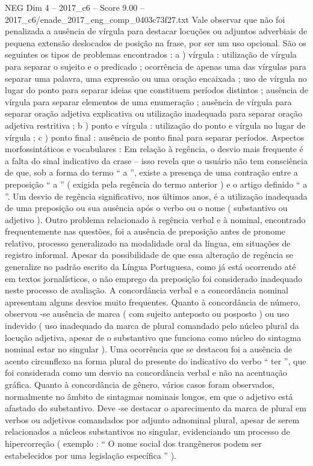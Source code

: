 \begin{textsample}{NEG Dim 4 – 2017\_c6 – Score 9.00 – 2017\_c6/enade\_2017\_eng\_comp\_0403c73f27.txt}
Vale observar que não foi penalizada a ausência de vírgula para destacar locuções ou adjuntos adverbiais de pequena extensão deslocados de posição na frase, por ser um uso opcional.
São os seguintes os tipos de problemas encontrados : a ) vírgula : utilização de vírgula para separar o sujeito e o predicado ; ocorrência de apenas uma das vírgulas para separar uma palavra, uma expressão ou uma oração encaixada ; uso de vírgula no lugar do ponto para separar ideias que constituem períodos distintos ; ausência de vírgula para separar elementos de uma enumeração ; ausência de vírgula para separar oração adjetiva explicativa ou utilização inadequada para separar oração adjetiva restritiva ; b ) ponto e vírgula : utilização do ponto e vírgula no lugar de vírgula ; c ) ponto final : ausência de ponto final para separar períodos.
Aspectos morfossintáticos e vocabulares : Em relação à regência, o desvio mais frequente é a falta do sinal indicativo da crase – isso revela que o usuário não tem consciência de que, sob a forma do termo “ a ”, existe a presença de uma contração entre a preposição “ a ” ( exigida pela regência do termo anterior ) e o artigo definido “ a ”.
Um desvio de regência significativo, nos últimos anos, é a utilização inadequada de uma preposição ou sua ausência após o verbo ou o nome ( substantivo ou adjetivo ).
Outro problema relacionado à regência verbal e à nominal, encontrado frequentemente nas questões, foi a ausência de preposição antes de pronome relativo, processo generalizado na modalidade oral da língua, em situações de registro informal.
Apesar da possibilidade de que essa alteração de regência se generalize no padrão escrito da Língua Portuguesa, como já está ocorrendo até em textos jornalísticos, o não emprego da preposição foi considerado inadequado neste processo de avaliação.
A concordância verbal e a concordância nominal apresentam alguns desvios muito frequentes.
Quanto à concordância de número, observou -se ausência de marca ( com sujeito anteposto ou posposto ) ou uso indevido ( uso inadequado da marca de plural comandado pelo núcleo plural da locução adjetiva, apesar de o substantivo que funciona como núcleo do sintagma nominal estar no singular ).
Uma ocorrência que se destacou foi a ausência de acento circunflexo na forma plural do presente do indicativo do verbo “ ter ”, que foi considerada como um desvio na concordância verbal e não na acentuação gráfica.
Quanto à concordância de gênero, vários casos foram observados, normalmente no âmbito de sintagmas nominais longos, em que o adjetivo está afastado do substantivo.
Deve -se destacar o aparecimento da marca de plural em verbos ou adjetivos comandados por adjunto adnominal plural, apesar de serem relacionados a núcleos substantivos no singular, evidenciando um processo de hipercorreção ( exemplo : “ O nome social dos trangêneros podem ser estabelecidos por uma legislação específica ” ).

\end{textsample}
